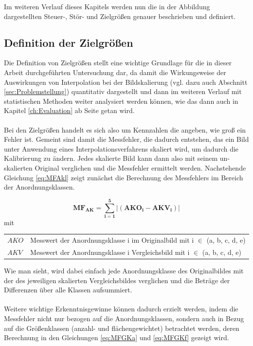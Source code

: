 \documentclass[
fontsize=10pt, 
listof = totoc,
parskip = half	
]{report}
\makeatletter
\newenvironment{conditions}
{\par\vspace{\abovedisplayskip}\noindent\begin{tabular}{>{$}l<{$} @{${}:{}$} l}}
	{\end{tabular}\par\vspace{\belowdisplayskip}}
\makeatother
\begin{document}
\noindent Im weiteren Verlauf dieses Kapitels werden nun die in der Abbildung dargestellten Steuer-, Stör- und Zielgrößen genauer beschrieben und definiert.

\subsection{Definition der Zielgrößen}
\label{subsec:DefZiel}

Die Definition von Zielgrößen stellt eine wichtige Grundlage für die in dieser Arbeit durchgeführten Untersuchung dar, da damit die Wirkungsweise der Auswirkungen von Interpolation bei der Bildskalierung (vgl. dazu auch Abschnitt \ref{sec:Problemstellung}) quantitativ dargestellt und dann im weiteren Verlauf mit statistischen Methoden weiter analysiert werden können, wie das dann auch in Kapitel \ref{ch:Evaluation} ab Seite \pageref{ch:Evaluation} getan wird.
\\\\
Bei den Zielgrößen handelt es sich also um Kennzahlen die angeben, wie groß ein Fehler ist. Gemeint sind damit die Messfehler, die dadurch entstehen, das ein Bild unter Anwendung eines Interpolationsverfahrens skaliert wird, um dadurch die Kalibrierung zu ändern. Jedes skalierte Bild kann dann also mit seinem un-skalierten Original verglichen und die Messfehler ermittelt werden. Nachstehende Gleichung \ref{eq:MFAkl} zeigt zunächst die Berechnung des Messfehlers im Bereich der Anordnungsklassen.

\begin{equation}\label{eq:MFAkl}
	\boxed{\mathbf{MF_{AK}	=	\sum_{i=1}^{5} |\left(AKO_i - AKV_i\right)}|}
\end{equation}
mit
\begin{conditions}
	AKO	&	Messwert der Anordnungsklasse i im Originalbild mit i $\in$ (a, b, c, d, e)\\
	AKV	&	Messwert der Anordnungsklasse i Vergleichsbild mit i $\in$ (a, b, c, d, e)
\end{conditions}

\noindent Wie man sieht, wird dabei einfach jede Anordnungsklasse des Originalbildes mit der des jeweiligen skalierten Vergleichsbildes verglichen und die Beträge der Differenzen über alle Klassen aufsummiert.
\\\\
\noindent Weitere wichtige Erkenntnisgewinne können dadurch erzielt werden, indem die Messfehler nicht nur bezogen auf die Anordnungsklassen, sondern auch in Bezug auf die Größenklassen (anzahl- und flächengewichtet) betrachtet werden, deren Berechnung in den Gleichungen \ref{eq:MFGKa} und \ref{eq:MFGKf} gezeigt wird.
\end{document}
